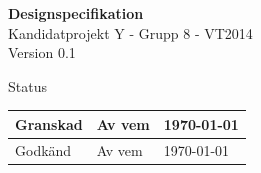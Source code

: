 \documentclass[a4paper,12pt,fleqn]{article}
\begin{document}
	\pagestyle{fancy}
	\vspace*{\fill}
		\begingroup
			\begin{center}
				\huge{\textbf{Designspecifikation}}
				\\
				\vspace{5pt}
				\normalsize
				Kandidatprojekt Y - Grupp 8 - VT2014
				\\
				Version 0.1
				\end{center}
		\endgroup
	\vspace*{\fill}
	
	\begin{center} %
		Status
		\\
		\vspace{3pt} %
	    \begin{tabular}{| p{3cm} | p{3cm} | p{3cm} |} %
	    \hline %
	    Granskad & Av vem & \today \\ \hline %
		Godkänd & Av vem & \today \\ \hline %

	    \end{tabular}
	\end{center}
	\vspace{2cm}
	\newpage
	
\end{document}
